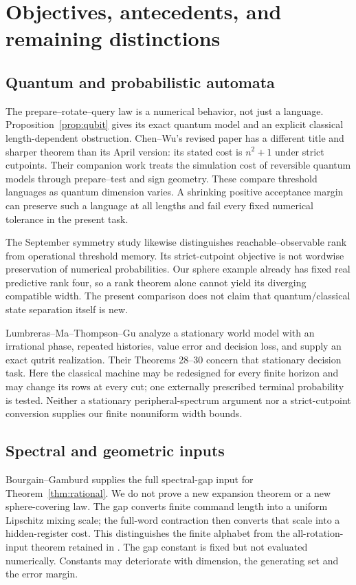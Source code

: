 \section{Objectives, antecedents, and remaining distinctions}
\label{sec:comparison}
\subsection{Quantum and probabilistic automata}
The prepare--rotate--query law is a numerical behavior, not just a
language. Proposition~\ref{prop:qubit} gives its exact quantum model and
an explicit classical length-dependent obstruction. Chen--Wu's revised
paper \cite{CW26a} has a different title and sharper theorem than its
April version: its stated cost is $n^2+1$ under strict cutpoints.
Their companion work \cite{CW26b} treats the simulation cost of reversible
quantum models through prepare--test and sign geometry. These compare
threshold languages as quantum dimension varies. A shrinking positive
acceptance margin can preserve such a language at all lengths and fail
every fixed numerical tolerance in the present task.

The September symmetry study \cite{ChenSym} likewise distinguishes
reachable--observable rank from operational threshold memory. Its
strict-cutpoint objective is not wordwise preservation of numerical
probabilities. Our sphere example already has fixed real predictive
rank four, so a rank theorem alone cannot yield its diverging compatible
width. The present comparison does not claim that quantum/classical
state separation itself is new.

Lumbreras--Ma--Thompson--Gu \cite{LMTG} analyze a stationary world model
with an irrational phase, repeated histories, value error and decision
loss, and supply an exact qutrit realization. Their Theorems 28--30
concern that stationary decision task. Here the classical machine may be
redesigned for every finite horizon and may change its rows at every cut;
one externally prescribed terminal probability is tested. Neither a
stationary peripheral-spectrum argument nor a strict-cutpoint conversion
supplies our finite nonuniform width bounds.

\subsection{Spectral and geometric inputs}
Bourgain--Gamburd \cite{BG12} supplies the full spectral-gap input for
Theorem~\ref{thm:rational}. We do not prove a new expansion theorem or a
new sphere-covering law. The gap converts finite command length into a
uniform Lipschitz mixing scale; the full-word contraction then converts
that scale into a hidden-register cost. This distinguishes the finite
alphabet from the all-rotation-input theorem retained in \cite{GTF35}.
The gap constant is fixed but not evaluated numerically. Constants may
deteriorate with dimension, the generating set and the error margin.

